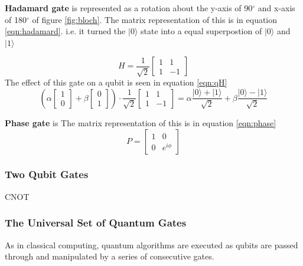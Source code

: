 {\bf Hadamard gate} is represented as a rotation about the y-axis of 90$^\circ$ and x-axis of 180$^\circ$ of figure \ref{fig:bloch}.
The matrix representation of this is in equation \ref{eqn:hadamard}. i.e. it turned the $|0\rangle$ state into a equal superpostion of $|0\rangle$ and $|1\rangle$

\begin{equation}\label{eqn:hadamard}
    H = \frac{1}{\sqrt{2}} \begin{bmatrix}
1 & 1 \\
1 & -1 
\end{bmatrix}  
\end{equation}
The effect of this gate on a qubit is seen in equation \ref{eqn:qH}
\begin{equation}\label{eqn:qH}
    \left( \alpha \begin{bmatrix}
1 \\
0 
\end{bmatrix}  + \beta  \begin{bmatrix}
0 \\
1 
\end{bmatrix}   \right) \cdot \frac{1}{\sqrt{2}} \begin{bmatrix}
1 & 1 \\
1 & -1 
\end{bmatrix} = \alpha \frac{|0\rangle +|1\rangle}{\sqrt{2}} + \beta \frac{|0\rangle - |1\rangle}{\sqrt{2}}
\end{equation}


{\bf Phase gate} is 
The matrix representation of this is in equation \ref{eqn:phase}
\begin{equation}\label{eqn:phase}
    P =  \begin{bmatrix}
1 & 0 \\
0 & e^{i \phi}
\end{bmatrix}  
\end{equation}


\subsubsection{Two Qubit Gates}\label{sec:twoqubit}
CNOT

\subsubsection{The Universal Set of Quantum Gates}
As in classical computing, quantum algorithms are executed as qubits are passed through and manipulated by a series of consecutive gates. 

